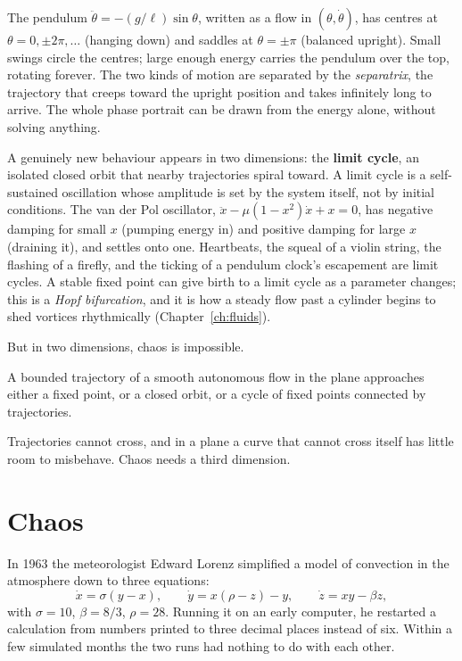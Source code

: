 \begin{example}
The pendulum $\ddot\theta = -(g/\ell)\sin\theta$, written as a flow in $(\theta,\dot\theta)$, has centres at $\theta = 0,\pm2\pi,\dots$ (hanging down) and saddles at $\theta=\pm\pi$ (balanced upright). Small swings circle the centres; large enough energy carries the pendulum over the top, rotating forever. The two kinds of motion are separated by the \emph{separatrix}, the trajectory that creeps toward the upright position and takes infinitely long to arrive. The whole phase portrait can be drawn from the energy alone, without solving anything.
\end{example}

A genuinely new behaviour appears in two dimensions: the \textbf{limit cycle}, an isolated closed orbit that nearby trajectories spiral toward. A limit cycle is a self-sustained oscillation whose amplitude is set by the system itself, not by initial conditions. The van der Pol oscillator, $\ddot x - \mu(1-x^2)\dot x + x = 0$, has negative damping for small $x$ (pumping energy in) and positive damping for large $x$ (draining it), and settles onto one. Heartbeats, the squeal of a violin string, the flashing of a firefly, and the ticking of a pendulum clock's escapement are limit cycles. A stable fixed point can give birth to a limit cycle as a parameter changes; this is a \emph{Hopf bifurcation}, and it is how a steady flow past a cylinder begins to shed vortices rhythmically (Chapter~\ref{ch:fluids}).

But in two dimensions, chaos is impossible.

\begin{theorem}
A bounded trajectory of a smooth autonomous flow in the plane approaches either a fixed point, or a closed orbit, or a cycle of fixed points connected by trajectories.
\end{theorem}
Trajectories cannot cross, and in a plane a curve that cannot cross itself has little room to misbehave. Chaos needs a third dimension.

\section{Chaos}

In 1963 the meteorologist Edward Lorenz simplified a model of convection in the atmosphere down to three equations:
\[
  \dot x = \sigma(y-x),\qquad \dot y = x(\rho - z) - y,\qquad \dot z = xy - \beta z,
\]
with $\sigma = 10$, $\beta = 8/3$, $\rho = 28$. Running it on an early computer, he restarted a calculation from numbers printed to three decimal places instead of six. Within a few simulated months the two runs had nothing to do with each other.

